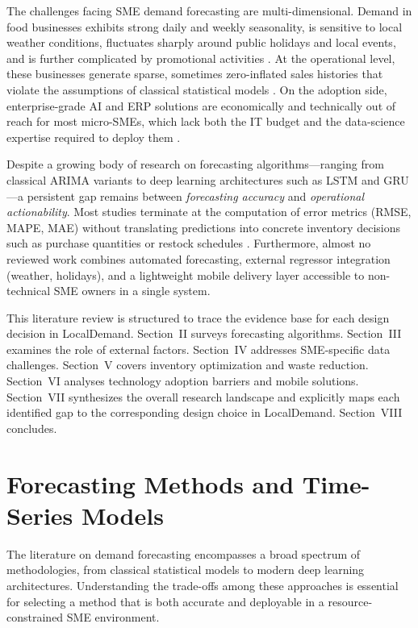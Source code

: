 \documentclass[conference]{IEEEtran}
\begin{document}
The challenges facing SME demand forecasting are multi-dimensional.
Demand in food businesses exhibits strong daily and weekly seasonality,
is sensitive to local weather conditions, fluctuates sharply around
public holidays and local events, and is further complicated by
promotional activities \cite{guler, lalitha2025, jain2024, qureshi2024}.
At the operational level, these businesses generate sparse, sometimes
zero-inflated sales histories that violate the assumptions of classical
statistical models \cite{susanto2026, munawar2026}. On the adoption
side, enterprise-grade AI and ERP solutions are economically and
technically out of reach for most micro-SMEs, which lack both the IT
budget and the data-science expertise required to deploy them
\cite{aree2025, yuniarty2025, srivastava2026}.

Despite a growing body of research on forecasting algorithms---ranging
from classical ARIMA variants to deep learning architectures such as
LSTM and GRU---a persistent gap remains between \emph{forecasting
accuracy} and \emph{operational actionability}. Most studies terminate
at the computation of error metrics (RMSE, MAPE, MAE) without
translating predictions into concrete inventory decisions such as
purchase quantities or restock schedules \cite{aqila2026, munawar2026,
rahmatillah2026}. Furthermore, almost no reviewed work combines
automated forecasting, external regressor integration (weather,
holidays), and a lightweight mobile delivery layer accessible to
non-technical SME owners in a single system.

This literature review is structured to trace the evidence base for each
design decision in LocalDemand. Section~II surveys forecasting
algorithms. Section~III examines the role of external factors.
Section~IV addresses SME-specific data challenges. Section~V covers
inventory optimization and waste reduction. Section~VI analyses
technology adoption barriers and mobile solutions. Section~VII
synthesizes the overall research landscape and explicitly maps each
identified gap to the corresponding design choice in LocalDemand.
Section~VIII concludes.

\section{Forecasting Methods and Time-Series Models}

The literature on demand forecasting encompasses a broad spectrum of
methodologies, from classical statistical models to modern deep learning
architectures. Understanding the trade-offs among these approaches is
essential for selecting a method that is both accurate and deployable
in a resource-constrained SME environment.
\end{document}
